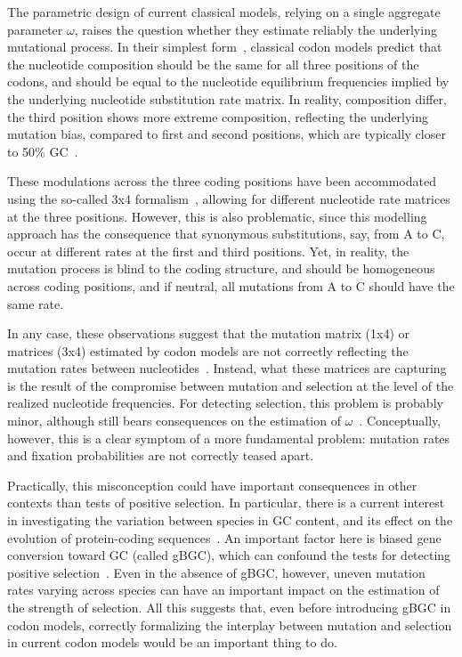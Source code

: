 The parametric design of current classical models, relying on a single aggregate parameter $\omega$, raises the question whether they estimate reliably the underlying mutational process.
In their simplest form~\citep{Muse1994}, classical codon models predict that the nucleotide composition should be the same for all three positions of the codons, and should be equal to the nucleotide equilibrium frequencies implied by the underlying nucleotide substitution rate matrix.
In reality, composition differ, the third position shows more extreme composition, reflecting the underlying mutation bias, compared to first and second positions, which are typically closer to 50\% GC~\citep{Singer2000}.

These modulations across the three coding positions have been accommodated using the so-called 3x4 formalism~\citep{Goldman1994, Pond2005a}, allowing for different nucleotide rate matrices at the three positions.
However, this is also problematic, since this modelling approach has the consequence that synonymous substitutions, say, from A to C, occur at different rates at the first and third positions.
Yet, in reality, the mutation process is blind to the coding structure, and should be homogeneous across coding positions, and if neutral, all mutations from A to C should have the same rate.

In any case, these observations suggest that the mutation matrix (1x4) or matrices (3x4) estimated by codon models are not correctly reflecting the mutation rates between nucleotides~\citep{Rodrigue2008a}.
Instead, what these matrices are capturing is the result of the compromise between mutation and selection at the level of the realized nucleotide frequencies.
For detecting selection, this problem is probably minor, although still bears consequences on the estimation of $\omega$~\citep{Spielman2015}.
Conceptually, however, this is a clear symptom of a more fundamental problem: mutation rates and fixation probabilities are not correctly teased apart.

Practically, this misconception could have important consequences in other contexts than tests of positive selection.
In particular, there is a current interest in investigating the variation between species in GC content, and its effect on the evolution of protein-coding sequences~\citep{Bolivar2019}.
An important factor here is biased gene conversion toward GC (called gBGC), which can confound the tests for detecting positive selection~\citep{Galtier2009,Ratnakumar2010, Figuet2014}.
Even in the absence of \acrshort{gBGC}, however, uneven mutation rates varying across species can have an important impact on the estimation of the strength of selection.
All this suggests that, even before introducing \acrshort{gBGC} in codon models, correctly formalizing the interplay between mutation and selection in current codon models would be an important thing to do.

